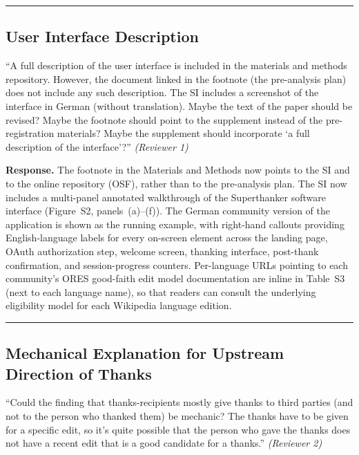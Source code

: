 \documentclass[12pt]{article}
\newenvironment{reviewquote}{%
  \def\FrameCommand{{\color{quotebarcolor}\vrule width 2pt}\colorbox{quotebg}}%
  \MakeFramed{\advance\hsize-\width \FrameRestore}%
  \small
}{%
  \endMakeFramed
}
\begin{document}
\bigskip\hrule\bigskip

\subsection{User Interface Description}

\begin{reviewquote}
``A full description of the user interface is included in the materials and methods repository. However, the document linked in the footnote (the pre-analysis plan) does not include any such description. The SI includes a screenshot of the interface in German (without translation). Maybe the text of the paper should be revised? Maybe the footnote should point to the supplement instead of the pre-registration materials? Maybe the supplement should incorporate `a full description of the interface'?'' \textit{(Reviewer 1)}
\end{reviewquote}

\textbf{Response.} The footnote in the Materials and Methods now points to the SI and to the online repository (OSF), rather than to the pre-analysis plan. The SI now includes a multi-panel annotated walkthrough of the Superthanker software interface (Figure~S2, panels~(a)--(f)). The German community version of the application is shown as the running example, with right-hand callouts providing English-language labels for every on-screen element across the landing page, OAuth authorization step, welcome screen, thanking interface, post-thank confirmation, and session-progress counters. Per-language URLs pointing to each community's ORES good-faith edit model documentation are inline in Table~S3 (next to each language name), so that readers can consult the underlying eligibility model for each Wikipedia language edition.

\bigskip\hrule\bigskip

\subsection{Mechanical Explanation for Upstream Direction of Thanks}

\begin{reviewquote}
``Could the finding that thanks-recipients mostly give thanks to third parties (and not to the person who thanked them) be mechanic? The thanks have to be given for a specific edit, so it's quite possible that the person who gave the thanks does not have a recent edit that is a good candidate for a thanks.'' \textit{(Reviewer 2)}
\end{reviewquote}
\end{document}
